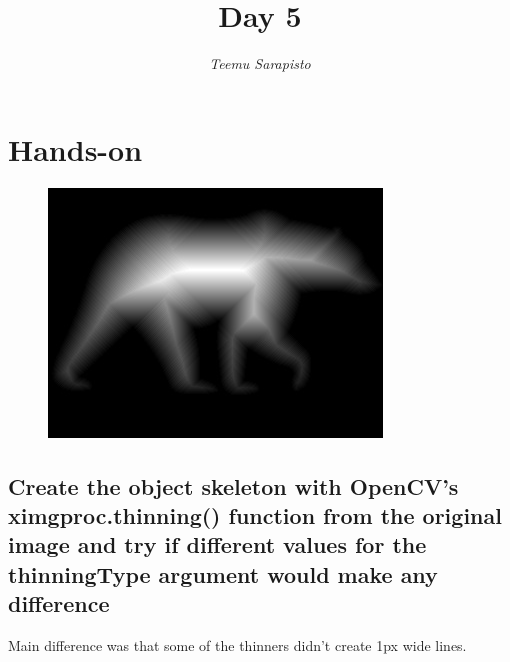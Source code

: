\documentclass{article}
\begin{document}
\title{Day 5}

\author{\emph{Teemu Sarapisto}}
\maketitle

\def\code#1{\texttt{#1}}
\newcommand{\aaa}[3]{%
  \fbox{\texttt{[image: \#1]}} \quad
  \fbox{\texttt{[image: \#2]}} \quad
  \fbox{\texttt{[image: \#3]}} \par}
\newcommand{\bbb}[3]{%
  \medskip\noindent\aaa{#1}{#1-#2}{#1-#3}}

\newpage

\setlength{\fboxsep}{0pt}%

\section{Hands-on}
\begin{figure}[h]
    \centering
    \includegraphics[scale=1.0]{distanced_bear}
\end{figure}

\subsection{Create the object skeleton with OpenCV’s ximgproc.thinning() function from the original image and try if different values for the thinningType argument would make any difference}
Main difference was that some of the thinners didn't create 1px wide lines.
\end{document}
